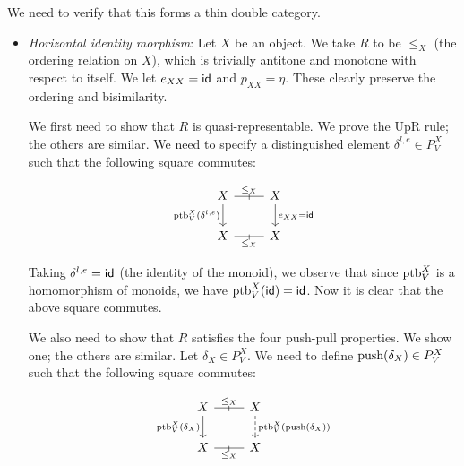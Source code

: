 We need to verify that this forms a thin double category. 
\begin{itemize}
    \item \emph{Horizontal identity morphism}: 
    Let $X$ be an object. We take $R$ to be $\le_X$ (the ordering relation on $X$),
    which is trivially antitone and monotone with respect to itself.
    We let $e_{XX} = \mathsf{id}$ and $p_{XX} = \eta$. These clearly preserve the
    ordering and bisimilarity.

    \vspace{3ex}
    
    We first need to show that $R$ is quasi-representable.
    We prove the UpR rule; the others are similar.
    We need to specify a distinguished element $\delta^{l,e} \in P_V^X$ such that
    the following square commutes:
    
    \[\begin{tikzcd}[ampersand replacement=\&]
        X \& X \\
        X \& X
        \arrow["{\ptb_V^X(\delta^{l,e})}"', from=1-1, to=2-1]
        \arrow["{e_{XX} = \id}", from=1-2, to=2-2]
        \arrow["{\le_X}", "\shortmid"{marking}, no head, from=1-1, to=1-2]
        \arrow["{\le_X}"', "\shortmid"{marking}, no head, from=2-1, to=2-2]
    \end{tikzcd}\]

    Taking $\delta^{l,e} = \mathsf{id}$ (the identity of the monoid), we observe that since
    $\text{ptb}_V^X$ is a homomorphism of monoids, we have $\text{ptb}_V^X(\mathsf{id}) = \mathsf{id}$.
    Now it is clear that the above square commutes.

    \vspace{3ex}

    We also need to show that $R$ satisfies the four push-pull properties.
    We show one; the others are similar. Let $\delta_X \in P_V^X$.
    We need to define $\text{push}(\delta_X) \in P_V^X$ such that the following square commutes:

    \[\begin{tikzcd}[ampersand replacement=\&]
	X \& X \\
	X \& X
	\arrow["{\le_X}", "\shortmid"{marking}, no head, from=1-1, to=1-2]
	\arrow["{\le_X}"', "\shortmid"{marking}, no head, from=2-1, to=2-2]
	\arrow["{\ptb_V^X(\delta_X)}"', from=1-1, to=2-1]
	\arrow["{\ptb_V^X(\push(\delta_X))}", dashed, from=1-2, to=2-2]
    \end{tikzcd}\]


\end{itemize}
